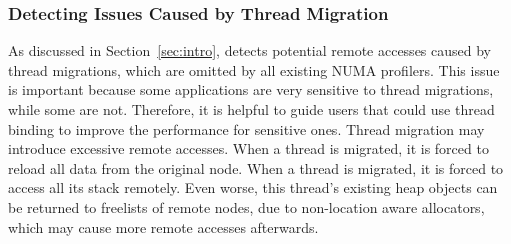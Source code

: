 


\subsubsection{Detecting Issues Caused by Thread Migration}

As discussed in Section~\ref{sec:intro}, \NP{} detects potential remote accesses caused by thread migrations, which are omitted by all existing NUMA profilers. This issue is important because some applications are very sensitive to thread migrations, while some are not. Therefore, it is helpful to guide users that could use thread binding to improve the performance for sensitive ones. Thread migration may introduce excessive remote accesses. When a thread is migrated, it is forced to reload all data from the original node. When a thread is migrated, it is forced to access all its stack remotely. Even worse, this thread's existing heap objects can be returned to freelists of remote nodes, due to non-location aware allocators, which may cause more remote accesses afterwards.       

